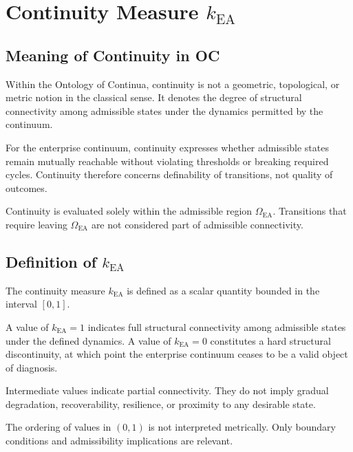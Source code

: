
\section{Continuity Measure $k_{\mathrm{EA}}$}

\subsection{Meaning of Continuity in OC}

Within the Ontology of Continua, continuity is not a geometric,
topological, or metric notion in the classical sense.
It denotes the degree of structural connectivity among admissible states
under the dynamics permitted by the continuum.

For the enterprise continuum, continuity expresses whether admissible
states remain mutually reachable without violating thresholds or
breaking required cycles.
Continuity therefore concerns definability of transitions, not quality
of outcomes.

Continuity is evaluated solely within the admissible region
$\Omega_{\mathrm{EA}}$.
Transitions that require leaving $\Omega_{\mathrm{EA}}$ are not
considered part of admissible connectivity.

\subsection{Definition of $k_{\mathrm{EA}}$}

The continuity measure $k_{\mathrm{EA}}$ is defined as a scalar quantity
bounded in the interval $[0,1]$.

A value of $k_{\mathrm{EA}} = 1$ indicates full structural connectivity
among admissible states under the defined dynamics.
A value of $k_{\mathrm{EA}} = 0$ constitutes a hard structural
discontinuity, at which point the enterprise continuum ceases to be a
valid object of diagnosis.

Intermediate values indicate partial connectivity.
They do not imply gradual degradation, recoverability, resilience, or
proximity to any desirable state.

The ordering of values in $(0,1)$ is not interpreted metrically.
Only boundary conditions and admissibility implications are relevant.

